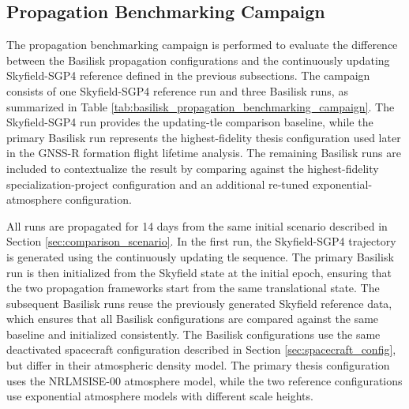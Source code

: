 \subsection{Propagation Benchmarking Campaign}

The propagation benchmarking campaign is performed to evaluate the difference between the Basilisk propagation configurations and the continuously updating Skyfield-SGP4 reference defined in the previous subsections. The campaign consists of one Skyfield-SGP4 reference run and three Basilisk runs, as summarized in Table \ref{tab:basilisk_propagation_benchmarking_campaign}. The Skyfield-SGP4 run provides the updating-\gls{tle} comparison baseline, while the primary Basilisk run represents the highest-fidelity thesis configuration used later in the GNSS-R formation flight lifetime analysis. The remaining Basilisk runs are included to contextualize the result by comparing against the highest-fidelity specialization-project configuration and an additional re-tuned exponential-atmosphere configuration.

All runs are propagated for 14 days from the same initial scenario described in Section \ref{sec:comparison_scenario}. In the first run, the Skyfield-SGP4 trajectory is generated using the continuously updating \gls{tle} sequence. The primary Basilisk run is then initialized from the Skyfield state at the initial epoch, ensuring that the two propagation frameworks start from the same translational state. The subsequent Basilisk runs reuse the previously generated Skyfield reference data, which ensures that all Basilisk configurations are compared against the same baseline and initialized consistently. The Basilisk configurations use the same deactivated spacecraft configuration described in Section \ref{sec:spacecraft_config}, but differ in their atmospheric density model. The primary thesis configuration uses the NRLMSISE-00 atmosphere model, while the two reference configurations use exponential atmosphere models with different scale heights.

